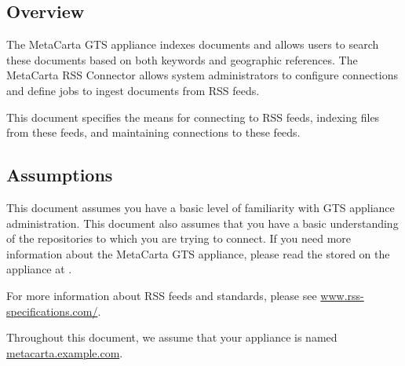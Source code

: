 %
%

\begin{changemargin}{1.5in}{0in}

\section{Overview}

The MetaCarta GTS appliance indexes documents and allows users to
search these documents based on both keywords and geographic
references. The MetaCarta RSS Connector allows system administrators
to configure connections and define jobs to ingest documents from RSS
feeds. 

This document specifies the means for connecting to RSS feeds,
indexing files from these feeds, and maintaining connections to
these feeds.

\subsection{Assumptions}

This document assumes you have a basic level of familiarity with GTS
appliance administration. This document also assumes that you have a
basic understanding of the repositories to which you are trying to
connect. If you need more information about the MetaCarta GTS
appliance, please read the  stored on the appliance at
.

For more information about RSS feeds and standards, please see
\url{www.rss-}\linebreak\url{specifications.com/}.

Throughout this document, we assume that your appliance is named \\
\url{metacarta.example.com}. 


\end{changemargin}

